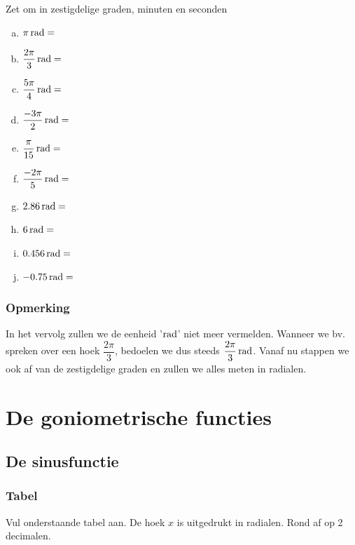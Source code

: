 \documentclass[a4paper,12pt,twoside]{article}
\begin{document}
\begin{oefening} Zet om in zestigdelige graden, minuten en seconden
\begin{multicols}{2}
\begin{enumerate}[(a)]
  \item $\pi \rad=$\arulefill
  \item $\dfrac{2\pi}{3} \rad=$\arulefill
  \item $\dfrac{5\pi}{4} \rad=$\arulefill
  \item $\dfrac{-3\pi}{2} \rad=$\arulefill
  \item $\dfrac{\pi}{15} \rad=$\arulefill
  \item $\dfrac{-2\pi}{5} \rad=$\arulefill
  \item $2.86 \rad=$\arulefill
  \item $6 \rad=$\arulefill
  \item $0.456 \rad=$\arulefill
  \item $-0.75 \rad=$\arulefill
\end{enumerate}
\end{multicols}
\end{oefening}

\subsubsection*{Opmerking}
In het vervolg zullen we de eenheid '$\rad$' niet meer vermelden. Wanneer we bv. spreken over een hoek  $\dfrac{2\pi}{3}$, bedoelen we dus steeds  $\dfrac{2\pi}{3} \rad$. Vanaf nu stappen we ook af van de zestigdelige graden en zullen we alles meten in radialen.

\cleardoublepage
\section{De goniometrische functies}

\subsection{De sinusfunctie}
\subsubsection*{Tabel}
Vul onderstaande tabel aan. De hoek $x$ is uitgedrukt in radialen. Rond af op 2 decimalen.
\end{document}

